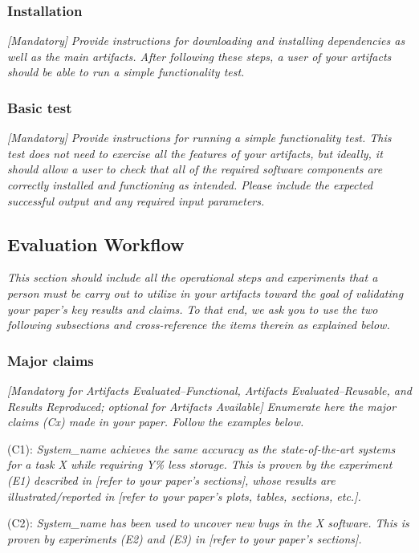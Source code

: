 
\subsubsection{Installation}

\emph{[Mandatory]}
%
\emph{Provide instructions for downloading and installing dependencies
as well as the main artifacts.  After following these steps, a user of
your artifacts should be able to run a simple functionality test.}


\subsubsection{Basic test}

\emph{[Mandatory]}
%
\emph{Provide instructions for running a simple functionality test.
This test does not need to exercise all the features of your
artifacts, but ideally, it should allow a user to check that all of
the required software components are correctly installed and
functioning as intended.  Please include the expected successful
output and any required input parameters.}


\subsection{Evaluation Workflow}

\emph{This section should include all the operational steps and
experiments that a person must be carry out to utilize in your
artifacts toward the goal of validating your paper's key results and
claims.  To that end, we ask you to use the two following subsections
and cross-reference the items therein as explained below.}


\subsubsection{Major claims}

\emph{[Mandatory for \emph{Artifacts Evaluated--Functional},
  \emph{Artifacts Evaluated--Reusable}, and \emph{Results Reproduced};
  optional for \emph{Artifacts Available}]}
%
\emph{Enumerate here the major claims (Cx) made in your paper.  Follow
the examples below.}
\bigskip

\begin{compactitem}
\item[(C1):]
  \emph{System\_name achieves the same accuracy as the
  state-of-the-art systems for a task X while requiring Y\% less
  storage.  This is proven by the experiment (E1) described in [refer
    to your paper's sections], whose results are illustrated/reported
  in [refer to your paper's plots, tables, sections, etc.].}

\item[(C2):]
  \emph{System\_name has been used to uncover new bugs in the X
  software.  This is proven by experiments (E2) and (E3) in [refer to
    your paper's sections].}
\end{compactitem}

